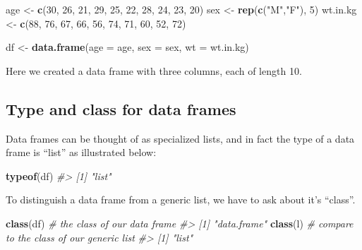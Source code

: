 \documentclass[]{book}
\newenvironment{Shaded}{\begin{snugshade}}{\end{snugshade}}
\newcommand{\CommentTok}[1]{\textcolor[rgb]{0.56,0.35,0.01}{\textit{#1}}}
\newcommand{\DataTypeTok}[1]{\textcolor[rgb]{0.13,0.29,0.53}{#1}}
\newcommand{\DecValTok}[1]{\textcolor[rgb]{0.00,0.00,0.81}{#1}}
\newcommand{\KeywordTok}[1]{\textcolor[rgb]{0.13,0.29,0.53}{\textbf{#1}}}
\newcommand{\NormalTok}[1]{#1}
\newcommand{\StringTok}[1]{\textcolor[rgb]{0.31,0.60,0.02}{#1}}
\theoremstyle{definition}
\theoremstyle{definition}
\theoremstyle{definition}
\theoremstyle{remark}
\begin{document}
\begin{Shaded}
\begin{Highlighting}[]
\NormalTok{age <-}\StringTok{ }\KeywordTok{c}\NormalTok{(}\DecValTok{30}\NormalTok{, }\DecValTok{26}\NormalTok{, }\DecValTok{21}\NormalTok{, }\DecValTok{29}\NormalTok{, }\DecValTok{25}\NormalTok{, }\DecValTok{22}\NormalTok{, }\DecValTok{28}\NormalTok{, }\DecValTok{24}\NormalTok{, }\DecValTok{23}\NormalTok{, }\DecValTok{20}\NormalTok{)}
\NormalTok{sex <-}\StringTok{ }\KeywordTok{rep}\NormalTok{(}\KeywordTok{c}\NormalTok{(}\StringTok{"M"}\NormalTok{,}\StringTok{"F"}\NormalTok{), }\DecValTok{5}\NormalTok{)}
\NormalTok{wt.in.kg <-}\StringTok{ }\KeywordTok{c}\NormalTok{(}\DecValTok{88}\NormalTok{, }\DecValTok{76}\NormalTok{, }\DecValTok{67}\NormalTok{, }\DecValTok{66}\NormalTok{, }\DecValTok{56}\NormalTok{, }\DecValTok{74}\NormalTok{, }\DecValTok{71}\NormalTok{, }\DecValTok{60}\NormalTok{, }\DecValTok{52}\NormalTok{, }\DecValTok{72}\NormalTok{)}

\NormalTok{df <-}\StringTok{ }\KeywordTok{data.frame}\NormalTok{(}\DataTypeTok{age =}\NormalTok{ age, }\DataTypeTok{sex =}\NormalTok{ sex, }\DataTypeTok{wt =}\NormalTok{ wt.in.kg)}
\end{Highlighting}
\end{Shaded}

Here we created a data frame with three columns, each of length 10.

\hypertarget{type-and-class-for-data-frames}{%
\subsection{Type and class for data
frames}\label{type-and-class-for-data-frames}}

Data frames can be thought of as specialized lists, and in fact the type
of a data frame is ``list'' as illustrated below:

\begin{Shaded}
\begin{Highlighting}[]
\KeywordTok{typeof}\NormalTok{(df)}
\CommentTok{#> [1] "list"}
\end{Highlighting}
\end{Shaded}

To distinguish a data frame from a generic list, we have to ask about
it's ``class''.

\begin{Shaded}
\begin{Highlighting}[]
\KeywordTok{class}\NormalTok{(df) }\CommentTok{# the class of our data frame}
\CommentTok{#> [1] "data.frame"}
\KeywordTok{class}\NormalTok{(l)  }\CommentTok{# compare to the class of our generic list}
\CommentTok{#> [1] "list"}
\end{Highlighting}
\end{Shaded}
\end{document}
